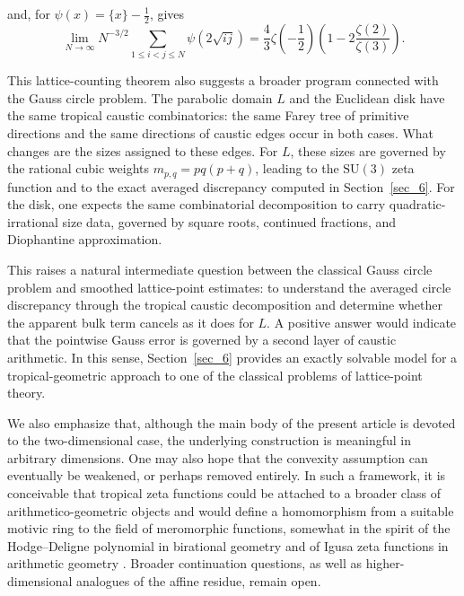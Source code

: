 \documentclass[a4paper,american,11pt]{amsart}
\theoremstyle{plain}
\theoremstyle{definition}
\begin{document}
and, for \(\psi(x)=\{x\}-\frac12\), gives
\begin{equation*}
\lim_{N\to\infty}N^{-3/2}
\sum_{1\le i<j\le N}\psi(2\sqrt{ij})
=
\frac43\zeta\!\left(-\frac12\right)
\left(1-2\frac{\zeta(2)}{\zeta(3)}\right).
\end{equation*}

This lattice-counting theorem also suggests a broader program connected with
the Gauss circle problem. The parabolic domain \(L\) and the Euclidean disk
have the same tropical caustic combinatorics: the same Farey tree of primitive
directions and the same directions of caustic edges occur in both cases. What
changes are the sizes assigned to these edges. For \(L\), these sizes are
governed by the rational cubic weights \(m_{p,q}=pq(p+q)\), leading to the
\(\mathrm{SU}(3)\) zeta function and to the exact averaged discrepancy
computed in Section~\ref{sec_6}. For the disk, one expects the same
combinatorial decomposition to carry quadratic-irrational size data, governed
by square roots, continued fractions, and Diophantine approximation.

This raises a natural intermediate question between the classical Gauss circle
problem and smoothed lattice-point estimates: to understand the averaged circle
discrepancy through the tropical caustic decomposition and determine whether
the apparent bulk term cancels as it does for \(L\). A positive answer would
indicate that the pointwise Gauss error is governed by a second layer of
caustic arithmetic. In this sense, Section~\ref{sec_6} provides an exactly
solvable model for a tropical-geometric approach to one of the classical
problems of lattice-point theory.

We also emphasize that, although the main body of the present article is
devoted to the two-dimensional case, the underlying construction is meaningful
in arbitrary dimensions. One may also hope that the convexity assumption can
eventually be weakened, or perhaps removed entirely. In such a framework, it
is conceivable that tropical zeta functions could be attached to a broader
class of arithmetico-geometric objects and would define a homomorphism from a
suitable motivic ring to the field of meromorphic functions, somewhat in the
spirit of the Hodge--Deligne polynomial in birational geometry
\cite{DeligneHodgeII,DeligneHodgeIII,DanilovKhovanskii1987} and of Igusa
zeta functions in arithmetic geometry \cite{Igusa1974,Igusa2000}. Broader
continuation questions, as well as higher-dimensional analogues of the affine
residue, remain open.
\end{document}
